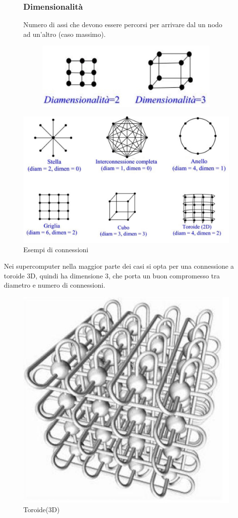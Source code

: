 \begin{figure}[H]
    \centering
    \begin{minipage}{0.45\textwidth}
        \subsubsection{Dimensionalità}
        Numero di assi che devono essere percorsi per arrivare dal un nodo ad un'altro (caso massimo).
    \end{minipage}
    \hfill
    \begin{minipage}{0.45\textwidth}
        \begin{figure}[H]
            \centering
            \includegraphics[width=0.65\linewidth]{assets/dimensionalita.jpeg}
        \end{figure}
    \end{minipage}
\end{figure}

\begin{figure}[H]
    \centering
    \includegraphics[width=0.5\linewidth]{assets/connessioni.jpeg}
    \caption{Esempi di connessioni}
\end{figure}

\begin{note}
    Nei supercomputer nella maggior parte dei casi si opta per una connessione a toroide 3D, quindi ha dimensione 3, che porta un buon compromesso tra diametro e numero di connessioni.

    \begin{figure}[H]
        \centering
        \includegraphics[width=0.3\linewidth]{assets/toroide3d.jpg}
        \caption{Toroide(3D)}
    \end{figure}
\end{note}

